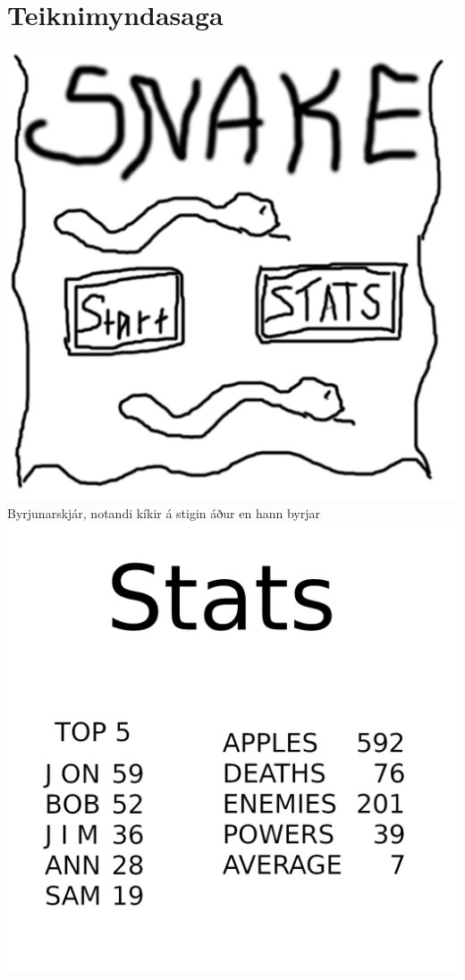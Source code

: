 \documentclass{article}
\begin{document}
\section*{Teiknimyndasaga}
\begin{center}
    \includegraphics[scale=0.75]{m1.png}\\
    Byrjunarskjár, notandi kíkir á stigin áður en hann byrjar\\
    \includegraphics[scale=0.75]{m2.png}\\

\end{center}
\end{document}
